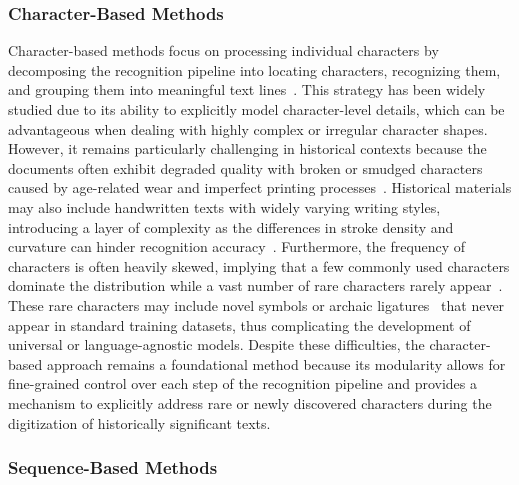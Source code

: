 \subsubsection{Character-Based Methods}

Character-based methods focus on processing individual characters by decomposing the recognition pipeline into locating characters, recognizing them, and grouping them into meaningful text lines~\cite{papytwin}. This strategy has been widely studied due to its ability to explicitly model character-level details, which can be advantageous when dealing with highly complex or irregular character shapes. However, it remains particularly challenging in historical contexts because the documents often exhibit degraded quality with broken or smudged characters caused by age-related wear and imperfect printing processes~\cite{broken}. Historical materials may also include handwritten texts with widely varying writing styles, introducing a layer of complexity as the differences in stroke density and curvature can hinder recognition accuracy~\cite{obc306}. Furthermore, the frequency of characters is often heavily skewed, implying that a few commonly used characters dominate the distribution while a vast number of rare characters rarely appear~\cite{fewran}. These rare characters may include novel symbols or archaic ligatures~\cite{hde,ligarature} that never appear in standard training datasets, thus complicating the development of universal or language-agnostic models. Despite these difficulties, the character-based approach remains a foundational method because its modularity allows for fine-grained control over each step of the recognition pipeline and provides a mechanism to explicitly address rare or newly discovered characters during the digitization of historically significant texts.

\subsubsection{Sequence-Based Methods}

